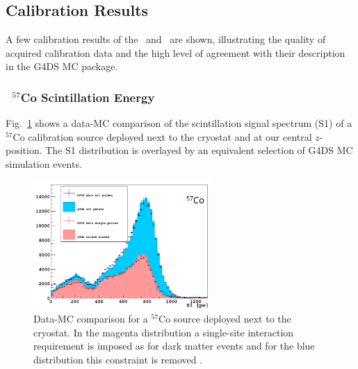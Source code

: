 

\subsection{Calibration Results}
A few calibration results of the \tpc\ and \lsv\ are shown, illustrating the quality of acquired calibration data and the high level of agreement with their description in the G4DS MC package.

\subsubsection{\tpc\ $^{57}$Co Scintillation Energy}
Fig.~\ref{fig:CalibData:Co57} shows a data-MC comparison of the scintillation signal spectrum (S1) of a $^{57}$Co calibration source deployed next to the cryostat and at our central $z$-position. The S1 distribution is overlayed by an equivalent selection of G4DS MC simulation events.

\begin{figure}[htbp]
\centering
\includegraphics[width=0.6\textwidth]{./Figures/57Co_Paolo_G4DS_UCLA.png}
\caption{Data-MC comparison for a $^{57}$Co source deployed next to the cryostat. In the magenta distribution a single-site interaction requirement is imposed as for dark matter events and for the blue distribution this constraint is removed \cite{DS50:G4DS:paper}.
\label{fig:CalibData:Co57}}
 \end{figure}

